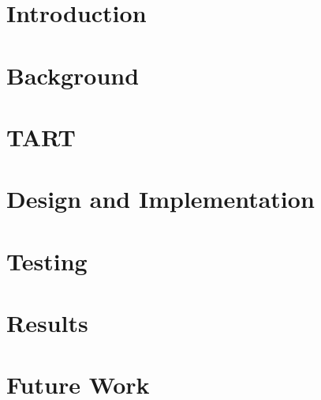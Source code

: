 \documentclass[12pt]{article}
\begin{document}

\tableofcontents
\newpage

\section{Introduction}


\section{Background}


\section{TART}


\section{Design and Implementation}


\section{Testing}


\section{Results}


\section{Future Work}



\end{document}
